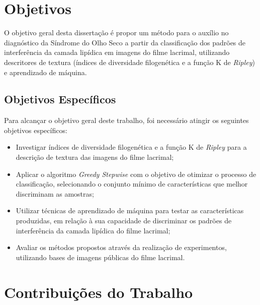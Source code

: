 \section{Objetivos}

O objetivo geral desta dissertação é propor um método para o auxílio no diagnóstico da Síndrome do Olho Seco a partir da classificação dos padrões de interferência da camada lipídica em imagens do filme lacrimal, utilizando descritores de textura (índices de diversidade filogenética e a função K de \textit{Ripley}) e aprendizado de máquina.

\subsection{Objetivos Específicos}

Para alcançar o objetivo geral deste trabalho, foi necessário atingir os seguintes objetivos específicos:

\begin{itemize}

    
    \item Investigar índices de diversidade filogenética e a função K de \textit{Ripley} para a descrição de textura das imagens do filme lacrimal;
    
    \item Aplicar o algoritmo \textit{Greedy Stepwise} com o objetivo de otimizar o processo de classificação, selecionando o conjunto mínimo de características que melhor discriminam as amostras;
    
     \item Utilizar técnicas de aprendizado de máquina para testar as características produzidas, em relação à sua capacidade de discriminar os padrões de interferência da camada lipídica do filme lacrimal;
     
	\item Avaliar os métodos propostos através da realização de experimentos, utilizando bases de imagens públicas do filme lacrimal.
\end{itemize}


\section{Contribuições do Trabalho}

